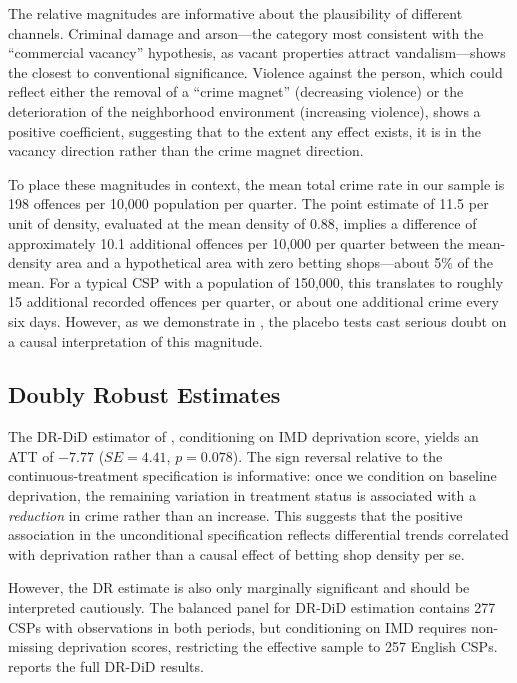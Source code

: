\documentclass[12pt]{article}
\begin{document}
The relative magnitudes are informative about the plausibility of different channels. Criminal damage and arson---the category most consistent with the ``commercial vacancy'' hypothesis, as vacant properties attract vandalism---shows the closest to conventional significance. Violence against the person, which could reflect either the removal of a ``crime magnet'' (decreasing violence) or the deterioration of the neighborhood environment (increasing violence), shows a positive coefficient, suggesting that to the extent any effect exists, it is in the vacancy direction rather than the crime magnet direction.

To place these magnitudes in context, the mean total crime rate in our sample is 198 offences per 10,000 population per quarter. The point estimate of 11.5 per unit of density, evaluated at the mean density of 0.88, implies a difference of approximately 10.1 additional offences per 10,000 per quarter between the mean-density area and a hypothetical area with zero betting shops---about 5\% of the mean. For a typical CSP with a population of 150,000, this translates to roughly 15 additional recorded offences per quarter, or about one additional crime every six days. However, as we demonstrate in , the placebo tests cast serious doubt on a causal interpretation of this magnitude.

\subsection{Doubly Robust Estimates}

The DR-DiD estimator of \citet{santanna2020}, conditioning on IMD deprivation score, yields an ATT of $-7.77$ ($SE = 4.41$, $p = 0.078$). The sign reversal relative to the continuous-treatment specification is informative: once we condition on baseline deprivation, the remaining variation in treatment status is associated with a \textit{reduction} in crime rather than an increase. This suggests that the positive association in the unconditional specification reflects differential trends correlated with deprivation rather than a causal effect of betting shop density per se.

However, the DR estimate is also only marginally significant and should be interpreted cautiously. The balanced panel for DR-DiD estimation contains 277 CSPs with observations in both periods, but conditioning on IMD requires non-missing deprivation scores, restricting the effective sample to 257 English CSPs.  reports the full DR-DiD results.
\end{document}
